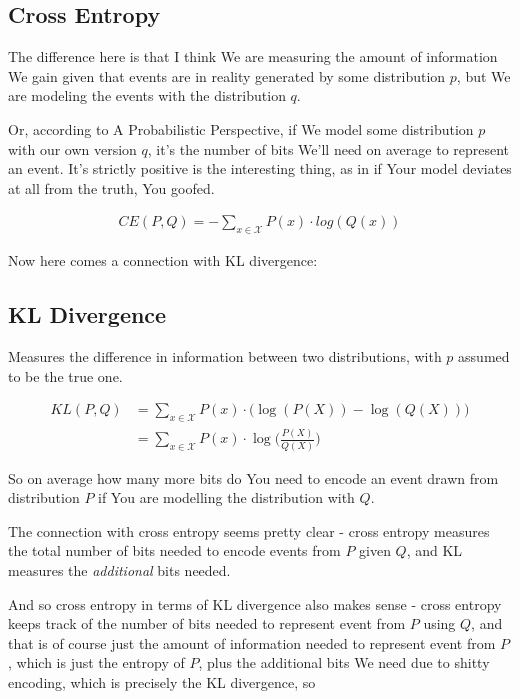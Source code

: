 \documentclass{article}
\begin{document}
	\subsection{Cross Entropy}
	
		The difference here is that I think We are measuring the amount of information We gain given that events are in reality generated by some distribution $p$, but We are modeling the events with the distribution $q$.
		
		Or, according to A Probabilistic Perspective, if We model some distribution $p$ with our own version $q$, it's the number of bits We'll need on average to represent an event. It's strictly positive is the interesting thing, as in if Your model deviates at all from the truth, You goofed.
		
		\begin{align}
			CE(P, Q) = -\sum_{x\in\mathcal{X}} P(x)\cdot log(Q(x))
		\end{align}
		
		Now here comes a connection with KL divergence:
		
	\subsection{KL Divergence}
	
		Measures the difference in information between two distributions, with $p$ assumed to be the true one.
		
		\begin{align}
			KL(P, Q) &= \sum_{x\in\mathcal{X}} P(x)\cdot\big(\log(P(X)) - \log(Q(X)) \big)\\
			&= \sum_{x\in\mathcal{X}} P(x)\cdot\log\bigg(\frac{P(X)}{Q(X)}\bigg)
		\end{align}
		
		So on average how many more bits do You need to encode an event drawn from distribution $P$ if You are modelling the distribution with $Q$.
		
		The connection with cross entropy seems pretty clear - cross entropy measures the total number of bits needed to encode events from $P$ given $Q$, and KL measures the \textit{additional} bits needed.
		
		And so cross entropy in terms of KL divergence also makes sense - cross entropy keeps track of the number of bits needed to represent event from $P$ using $Q$, and that is of course just the amount of information needed to represent event from $P$, which is just the entropy of $P$, plus the additional bits We need due to shitty encoding, which is precisely the KL divergence, so
		
\end{document}
